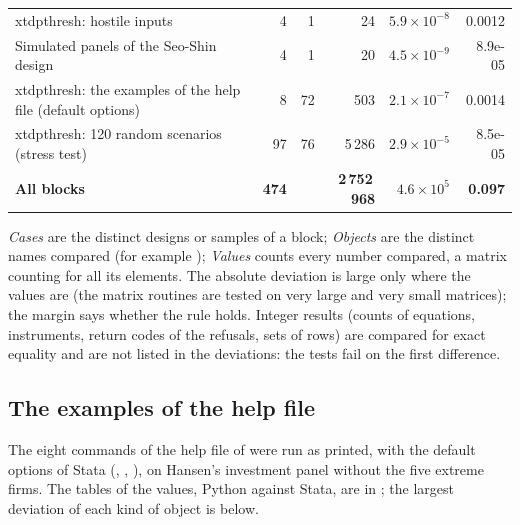 \documentclass[
  10.5pt,
  a4paper,
]{article}
\begin{document}
\begin{longtable}{@{}p{7.4cm}rrrrr@{}}
xtdpthresh: hostile inputs & 4 & 1 & 24 & $5.9\times10^{-8}$ & 0.0012 \\
Simulated panels of the Seo-Shin design & 4 & 1 & 20 & $4.5\times10^{-9}$ & 8.9e-05 \\
xtdpthresh: the examples of the help file (default options) & 8 & 72 & 503 & $2.1\times10^{-7}$ & 0.0014 \\
xtdpthresh: 120 random scenarios (stress test) & 97 & 76 & 5\,286 & $2.9\times10^{-5}$ & 8.5e-05 \\
\midrule
\textbf{All blocks} & \textbf{474} & & \textbf{2\,752\,968} & \textbf{$4.6\times10^{5}$} & \textbf{0.097} \\
\bottomrule
\end{longtable}

\noindent \emph{Cases} are the distinct designs or samples of a block; \emph{Objects} are the
distinct names compared (for example ); \emph{Values} counts every number compared, a
matrix counting for all its elements. The absolute deviation is large only where the values
are (the matrix routines are tested on very large and very small matrices); the margin says
whether the rule holds. Integer results (counts of equations, instruments, return
codes of the refusals, sets of rows) are compared for exact equality and are not listed in the
deviations: the tests fail on the first difference.

\subsection{The examples of the help file}

The eight commands of the help file of  were run as printed, with the default options of Stata
(, , ), on Hansen's investment panel without the five extreme firms.
The tables of the values, Python against Stata, are in ; the largest deviation of each
kind of object is below.
\end{document}
